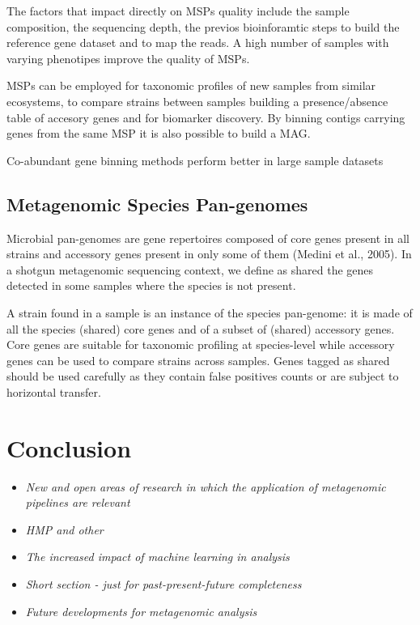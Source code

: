 \documentclass{article}
\begin{document}
The factors that impact directly on MSPs quality include the sample composition, the sequencing depth, the previos bioinforamtic steps to build the reference gene dataset and to map the reads.
A high number of samples with varying phenotipes improve the quality of MSPs.

MSPs can be employed for taxonomic profiles of new samples from similar ecosystems, to compare strains between samples building a presence/absence table of accesory genes and for biomarker discovery. By binning contigs carrying genes from the same MSP it is also possible to build a MAG.

Co-abundant gene binning methods perform better in large sample datasets

\subsection{Metagenomic Species Pan-genomes}
Microbial pan-genomes are gene repertoires composed of core genes present in all strains and accessory genes present in only some of them (Medini et al., 2005). In a shotgun metagenomic sequencing context, we define as shared the genes detected in some samples where the species is not present.

A strain found in a sample is an instance of the species pan-genome: it is made of all the species (shared) core genes and of a subset of (shared) accessory genes. Core genes are suitable for taxonomic profiling at species-level while accessory genes can be used to compare strains across samples. Genes tagged as shared should be used carefully as they contain false positives counts or are subject to horizontal transfer.
 


	\section{Conclusion}
\begin{itemize}
	\item \emph{New and open areas of research in which the application of metagenomic pipelines are relevant}
	\item \emph{HMP and other }
	\item \emph{The increased impact of machine learning in analysis}
	\item \emph{Short section - just for past-present-future completeness}
	\item \emph{Future developments for metagenomic analysis}
\end{itemize}
\end{document}
